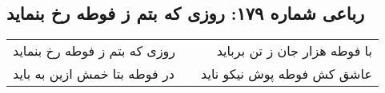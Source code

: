 \begin{center}
\section*{رباعی شماره ۱۷۹: روزی که بتم ز فوطه رخ بنماید}
\label{sec:sh179}
\begin{longtable}{l p{0.5cm} r}
روزی که بتم ز فوطه رخ بنماید
&&
با فوطه هزار جان ز تن برباید
\\
در فوطه بتا خمش ازین به باید
&&
عاشق کش فوطه پوش نیکو ناید
\\
\end{longtable}
\end{center}

